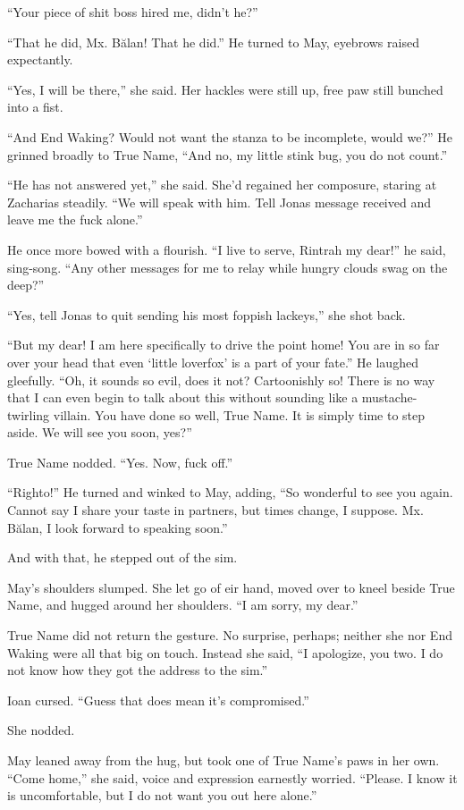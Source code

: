 ``Your piece of shit boss hired me, didn't he?''

``That he did, Mx. Bălan! That he did.'' He turned to May, eyebrows raised expectantly.

``Yes, I will be there,'' she said. Her hackles were still up, free paw still bunched into a fist.

``And End Waking? Would not want the stanza to be incomplete, would we?'' He grinned broadly to True Name, ``And no, my little stink bug, you do not count.''

``He has not answered yet,'' she said. She'd regained her composure, staring at Zacharias steadily. ``We will speak with him. Tell Jonas message received and leave me the fuck alone.''

He once more bowed with a flourish. ``I live to serve, Rintrah my dear!'' he said, sing-song. ``Any other messages for me to relay while hungry clouds swag on the deep?''

``Yes, tell Jonas to quit sending his most foppish lackeys,'' she shot back.

``But my dear! I am here specifically to drive the point home! You are in so far over your head that even `little loverfox' is a part of your fate.'' He laughed gleefully. ``Oh, it sounds so evil, does it not? Cartoonishly so! There is no way that I can even begin to talk about this without sounding like a mustache-twirling villain. You have done so well, True Name. It is simply time to step aside. We will see you soon, yes?''

True Name nodded. ``Yes. Now, fuck off.''

``Righto!'' He turned and winked to May, adding, ``So wonderful to see you again. Cannot say I share your taste in partners, but times change, I suppose. Mx. Bălan, I look forward to speaking soon.''

And with that, he stepped out of the sim.

May's shoulders slumped. She let go of eir hand, moved over to kneel beside True Name, and hugged around her shoulders. ``I am sorry, my dear.''

True Name did not return the gesture. No surprise, perhaps; neither she nor End Waking were all that big on touch. Instead she said, ``I apologize, you two. I do not know how they got the address to the sim.''

Ioan cursed. ``Guess that does mean it's compromised.''

She nodded.

May leaned away from the hug, but took one of True Name's paws in her own. ``Come home,'' she said, voice and expression earnestly worried. ``Please. I know it is uncomfortable, but I do not want you out here alone.''

